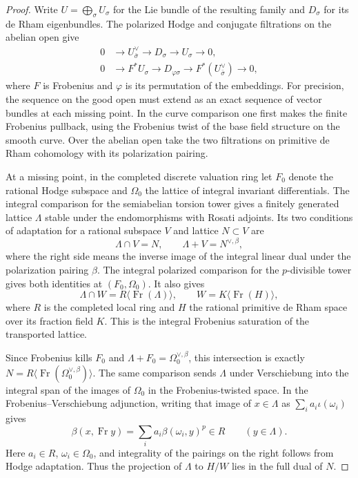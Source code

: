 \begin{proof}
Write \(U=\bigoplus_\sigma U_\sigma\) for the Lie bundle of the
resulting family and \(D_\sigma\) for its de Rham eigenbundles.
The polarized Hodge and conjugate filtrations on the abelian
open give
\[
 \begin{aligned}
 0&\to U_{\bar\sigma}^\vee\to D_\sigma\to U_\sigma\to0,\\
 0&\to F^*U_\sigma\to D_{\varphi\sigma}
          \to F^*(U_{\bar\sigma}^\vee)\to0 ,
 \end{aligned}
\]
where \(F\) is Frobenius and \(\varphi\) is its permutation
of the embeddings. For precision, the sequence on the good open must extend as an
exact sequence of vector bundles at each missing point. In the
curve comparison one first makes the finite Frobenius pullback,
using the Frobenius twist of the base field structure on the smooth
curve. Over the abelian open take the two filtrations on primitive
de Rham cohomology with its polarization pairing.

At a missing
point, in the completed discrete valuation ring let \(F_0\) denote
the rational Hodge subspace and \(\Omega_0\) the lattice of integral
invariant differentials. The integral comparison for the
semiabelian torsion tower gives a finitely generated lattice
\(\Lambda\) stable under the endomorphisms with Rosati adjoints.
Its two conditions of adaptation for a rational subspace \(V\)
and lattice \(N\subset V\) are
\[
 \Lambda\cap V=N,\qquad \Lambda+V=N^{\vee,\beta},
\]
where the right side means the inverse image of the integral
linear dual under the polarization pairing \(\beta\).
The integral polarized comparison for the \(p\)-divisible tower
gives both identities at \((F_0,\Omega_0)\). It also gives
\[
 \Lambda\cap W=R\langle\operatorname{Fr}(\Lambda)\rangle,
 \qquad W=K\langle\operatorname{Fr}(H)\rangle ,
\]
where \(R\) is the completed local ring and \(H\) the rational
primitive de Rham space over its fraction field \(K\). This is the
integral Frobenius saturation of the transported lattice.

Since
Frobenius kills \(F_0\) and
\(\Lambda+F_0=\Omega_0^{\vee,\beta}\), this intersection is exactly
\(N=R\langle\operatorname{Fr}(\Omega_0^{\vee,\beta})\rangle\).
The same comparison sends \(\Lambda\) under Verschiebung into the
integral span of the images of \(\Omega_0\) in the Frobenius-twisted
space. In the Frobenius--Verschiebung adjunction, writing that
image of \(x\in\Lambda\) as \(\sum_i a_i\iota(\omega_i)\) gives
\[
     \beta(x,\operatorname{Fr} y)
          =\sum_i a_i\beta(\omega_i,y)^p\in R
                    \qquad (y\in\Lambda).
\]
Here \(a_i\in R\), \(\omega_i\in\Omega_0\), and integrality of the
pairings on the right follows from Hodge adaptation. Thus the
projection of \(\Lambda\) to \(H/W\) lies in the full dual of
\(N\).


\end{proof}
